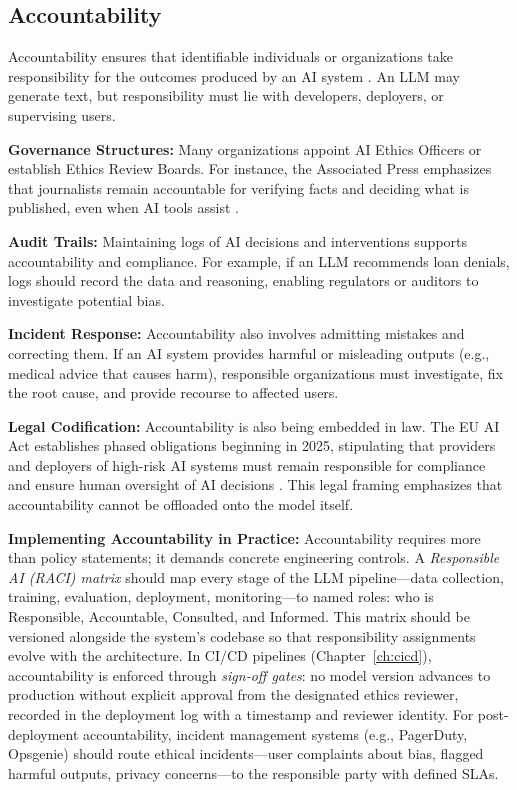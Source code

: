 \subsection{Accountability}

Accountability ensures that identifiable individuals or organizations take responsibility for the outcomes produced by an AI system \cite{iapp2023}. An LLM may generate text, but responsibility must lie with developers, deployers, or supervising users.

\textbf{Governance Structures:} Many organizations appoint AI Ethics Officers or establish Ethics Review Boards. For instance, the Associated Press emphasizes that journalists remain accountable for verifying facts and deciding what is published, even when AI tools assist \cite{ap2023}.

\textbf{Audit Trails:} Maintaining logs of AI decisions and interventions supports accountability and compliance. For example, if an LLM recommends loan denials, logs should record the data and reasoning, enabling regulators or auditors to investigate potential bias.

\textbf{Incident Response:} Accountability also involves admitting mistakes and correcting them. If an AI system provides harmful or misleading outputs (e.g., medical advice that causes harm), responsible organizations must investigate, fix the root cause, and provide recourse to affected users.

\textbf{Legal Codification:} Accountability is also being embedded in law. The EU AI Act establishes phased obligations beginning in 2025, stipulating that providers and deployers of high-risk AI systems must remain responsible for compliance and ensure human oversight of AI decisions \cite{euai2025,eu_ai_act_policy_page}. This legal framing emphasizes that accountability cannot be offloaded onto the model itself.

\textbf{Implementing Accountability in Practice:} Accountability requires more than policy statements; it demands concrete engineering controls. A \emph{Responsible AI (RACI) matrix} should map every stage of the LLM pipeline---data collection, training, evaluation, deployment, monitoring---to named roles: who is Responsible, Accountable, Consulted, and Informed. This matrix should be versioned alongside the system's codebase so that responsibility assignments evolve with the architecture. In CI/CD pipelines (Chapter~\ref{ch:cicd}), accountability is enforced through \emph{sign-off gates}: no model version advances to production without explicit approval from the designated ethics reviewer, recorded in the deployment log with a timestamp and reviewer identity. For post-deployment accountability, incident management systems (e.g., PagerDuty, Opsgenie) should route ethical incidents---user complaints about bias, flagged harmful outputs, privacy concerns---to the responsible party with defined SLAs.


